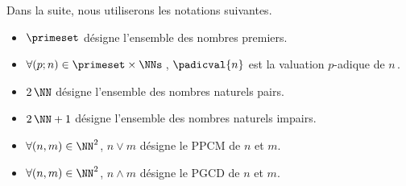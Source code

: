 Dans la suite, nous utiliserons les notations suivantes.
\begin{itemize}
	\item $\primeset$ désigne l'ensemble des nombres premiers.
	
	
	\item $\forall (p ; n) \in \primeset \times \NNs$\,, $\padicval{n}$ est la valuation $p$-adique de $n$\,.

	\item $2\,\NN$ désigne l'ensemble des nombres naturels pairs.
	
	\item $2\,\NN + 1$ désigne l'ensemble des nombres naturels impairs.
	
	\item $\forall (n , m) \in \NN^2$, $n \vee m$ désigne le PPCM de $n$ et $m$.

	\item $\forall (n , m) \in \NN^2$, $n \wedge m$ désigne le PGCD de $n$ et $m$.
\end{itemize}
